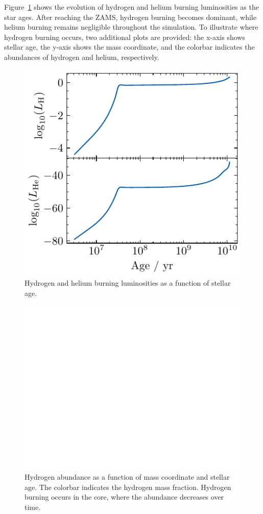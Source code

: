 \documentclass[twocolumn,fontsize=11pt]{scrartcl}
\begin{document}
Figure~\ref{fig:q14_luminosity} shows the evolution of hydrogen and helium burning luminosities as the star ages. After reaching the ZAMS, hydrogen burning becomes dominant, while helium burning remains negligible throughout the simulation. To illustrate where hydrogen burning occurs, two additional plots are provided: the x-axis shows stellar age, the y-axis shows the mass coordinate, and the colorbar indicates the abundances of hydrogen and helium, respectively. 

\begin{figure}[htbp]
    \centering
    \includegraphics{q14_luminosity.pdf}
    \caption{Hydrogen and helium burning luminosities as a function of stellar age.}
    \label{fig:q14_luminosity}
\end{figure}
\begin{figure}[htbp]
    \centering
    \includegraphics{q14_abundancy_H.pdf}
    \caption{Hydrogen abundance as a function of mass coordinate and stellar age. The colorbar indicates the hydrogen mass fraction. Hydrogen burning occurs in the core, where the abundance decreases over time.}
    \label{fig:q14_abundancy_H}
\end{figure}
\end{document}
